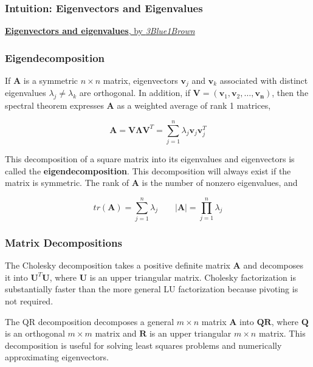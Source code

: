 \documentclass{beamer}
\begin{document}
 \begin{frame}
\frametitle{Intuition: Eigenvectors and Eigenvalues}

\href{https://www.youtube.com/watch?v=PFDu9oVAE-g&index=13&list=PLZHQObOWTQDPD3MizzM2xVFitgF8hE_ab}{\textbf{Eigenvectors and eigenvalues}, by \textit{3Blue1Brown}}
\end{frame}

\begin{frame}
\frametitle{Eigendecomposition}
If  $\mathbf{A}$ is a symmetric $n \times n$ matrix, eigenvectors $\mathbf{v}_j$ and $\mathbf{v}_k$ associated with distinct eigenvalues $\lambda_j \neq \lambda_k$ are orthogonal.  In addition, if $\mathbf{V} = (\mathbf{v}_1, \mathbf{v}_2, \hdots, \mathbf{v_n})$, then the spectral theorem expresses $\mathbf{A}$ as a weighted average of rank 1 matrices,

\[\mathbf{A} = \mathbf{V\Lambda V}^T = \sum_{j=1}^n \lambda_j \mathbf{v}_j \mathbf{v}_j ^T\]

This decomposition of a square matrix into its eigenvalues and eigenvectors is called the \textbf{eigendecomposition}.  This decomposition will always exist if the matrix is symmetric.  The rank of $\mathbf{A}$ is the number of nonzero eigenvalues, and

\[tr(\mathbf{A}) = \sum_{j = 1}^n \lambda_j \qquad |\mathbf{A}| = \prod_{j=1}^n \lambda_j \]

\end{frame}

\begin{frame}
\frametitle{Matrix Decompositions}
The Cholesky decomposition takes a positive definite matrix $\mathbf{A}$ and decomposes it into $\mathbf{U}^T\mathbf{U}$, where $\mathbf{U}$ is an upper triangular matrix.  Cholesky factorization is substantially faster than the more general LU factorization because pivoting is not required.  

\vspace{5mm}

The QR decomposition decomposes a general $m \times n$ matrix $\mathbf{A}$ into $\mathbf{QR}$, where $\mathbf{Q}$ is an orthogonal $m \times m$ matrix and $\mathbf{R}$ is an upper triangular $m \times n$ matrix.  This decomposition is useful for solving least squares problems and numerically approximating eigenvectors. 
\end{frame}
\end{document}
